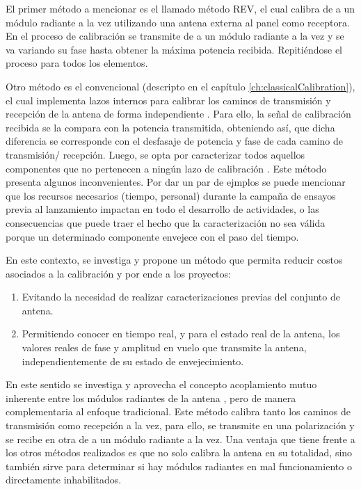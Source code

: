 El primer método a mencionar es el llamado método REV, el cual calibra de a un módulo radiante a la vez utilizando una
antena externa al panel como receptora. En el proceso de calibración se transmite de a un módulo radiante a la vez
y se va variando su fase hasta obtener la máxima potencia recibida. Repitiéndose el proceso para todos los elementos.

Otro método es el convencional (descripto en el capítulo \ref{ch:classicalCalibration}), el cual implementa lazos internos
para calibrar los caminos de transmisión y recepción de la antena de forma independiente \cite{Makhoul2012}
\cite{Luscombe1990}\cite{Seifert1996}\cite{Dall1994}\cite{Freeman1995}\cite{Bibby2003}\cite{Bast2003}\cite{Stove2004}
\cite{Srivastava1996}\cite{Wang2010}. Para ello, la señal de calibración recibida se la compara con la potencia transmitida,
obteniendo así, que dicha diferencia se corresponde con el desfasaje de potencia y fase de cada camino de transmisión/
recepción. Luego, se opta por caracterizar todos aquellos componentes que no pertenecen a ningún lazo de calibración
\cite{Freeman1995}. Este método presenta algunos inconvenientes. Por dar un par de ejmplos se puede mencionar que los recursos
necesarios (tiempo, personal) durante la campaña de ensayos previa al lanzamiento impactan en todo el desarrollo de actividades,
o las consecuencias que puede traer el hecho que la caracterización no sea válida porque un determinado componente
envejece con el paso del tiempo.

En este contexto, se investiga y propone un método que permita reducir costos asociados a la calibración y por ende a los
proyectos:

\begin{enumerate}
    \item Evitando la necesidad de realizar caracterizaciones previas del conjunto de antena.
    \item Permitiendo conocer en tiempo real, y para el estado real de la antena, los valores reales de fase y amplitud en
		vuelo que transmite la antena, independientemente de su estado de envejecimiento.
\end{enumerate}

En este sentido se investiga y aprovecha el concepto acoplamiento mutuo inherente entre los módulos radiantes de la antena
\cite{Aumann1989}, pero de manera complementaria al enfoque tradicional. Este método calibra tanto los caminos de transmisión
como recepción a la vez, para ello, se transmite en una polarización y se recibe en otra de a un módulo radiante a la vez.
Una ventaja que tiene frente a los otros métodos realizados es que no solo calibra la antena en su totalidad, sino también
sirve para determinar si hay módulos radiantes en mal funcionamiento o directamente inhabilitados.

